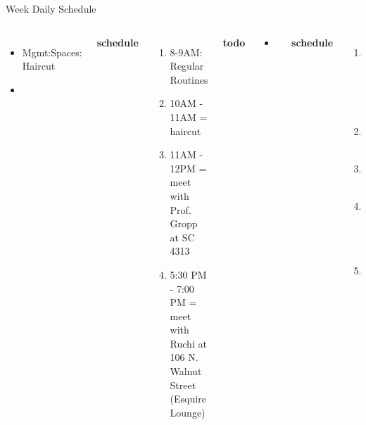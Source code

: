 \begin{frame}
\begin{columns}
\begin{column}{0.50\linewidth}
\begin{block}{Week Daily Schedule}
{\begin{columns}
\begin{itemize}
            \tiny \item \tiny Mgmt:Spaces: Haircut  

            
          \item \tiny {} 
          \end{itemize}
          \textbf{\small schedule}\\
          \begin{enumerate}
            \tiny \item \tiny 8-9AM: Regular Routines 
            
          \item \tiny 10AM - 11AM  = haircut 
            \tiny \item \tiny 11AM - 12PM = meet with Prof. Gropp at
            SC 4313  
          \item \tiny 5:30 PM - 7:00 PM = meet with Ruchi at 106
            N. Walnut Street (Esquire Lounge) 
          
          \end{enumerate}
          
          \textbf{\small todo}\\
          \begin{itemize} 
            \tiny \item \tiny
          \end{itemize}
          \textbf{\small schedule}\\ 
          \begin{enumerate}
            \tiny \item \tiny 7-7:30PM = food + organize.  
            \tiny \item \tiny 7:30PM -8PM = 
            \tiny \item \tiny 8PM -9PM = 
            \tiny \item \tiny 9:45PM - 10:30PM = go out 
            \tiny \item \tiny 2AM -3AM =  message Samir + add people
          \end{enumerate}
          
          \textbf{\small todo}\\
          \begin{itemize} 
           \tiny \item \tiny 
          \end{itemize}


\end{columns}}
\end{block}
\end{column}
\end{columns}
\end{frame}

